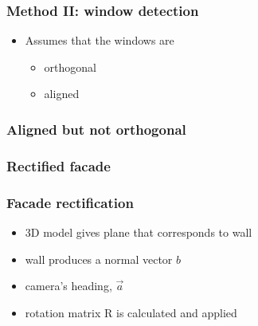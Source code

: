 \documentclass{beamer}
\begin{document}
\frame
{
	\frametitle{Method II: window detection}
	\begin{itemize}
	\item <+-| alert@+> Assumes that the windows are
	\begin{itemize}
		\item <+-| alert@+> orthogonal
		\item <+-| alert@+> aligned
	\end{itemize}
	\end{itemize}

}

\frame
{
	\frametitle{Aligned but not orthogonal}
}

\frame
{
	\frametitle{Rectified facade}
}

\frame
{
	\frametitle{Facade rectification}
	\begin{itemize}
		\item <+-| alert@+> 3D model gives plane that corresponds to wall
		\item <+-| alert@+> wall produces a normal vector $b$
		\item <+-| alert@+> camera's heading, $\vec{a}$
		\item <+-| alert@+> rotation matrix R is calculated and applied
	\end{itemize}
}
\end{document}
